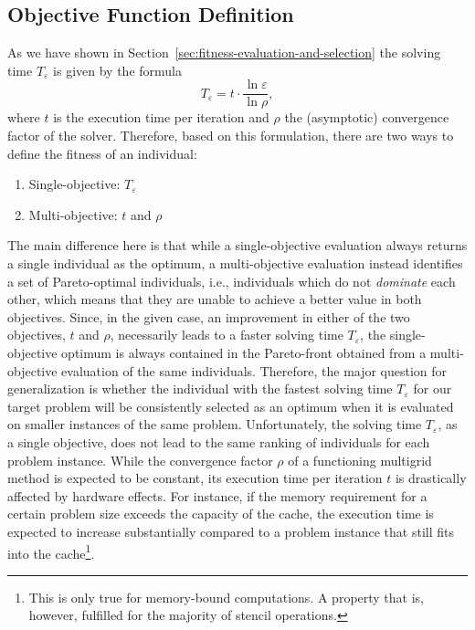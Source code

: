 \subsection{Objective Function Definition}
\label{sec:generalization:objective-function-definition}
As we have shown in Section~\ref{sec:fitness-evaluation-and-selection} the solving time $T_{\varepsilon}$ is given by the formula
\begin{equation*}
	T_{\varepsilon} = t \cdot \frac{\ln \varepsilon}{\ln \rho},
\end{equation*}
where $t$ is the execution time per iteration and $\rho$ the (asymptotic) convergence factor of the solver.
Therefore, based on this formulation, there are two ways to define the fitness of an individual:
\begin{enumerate}
	\item Single-objective: $T_{\varepsilon}$
	\item Multi-objective:  $t$ and $\rho$
\end{enumerate}
The main difference here is that while a single-objective evaluation always returns a single individual as the optimum, a multi-objective evaluation instead identifies a set of Pareto-optimal individuals, i.e., individuals which do not \emph{dominate} each other, which means that they are unable to achieve a better value in both objectives.
Since, in the given case, an improvement in either of the two objectives, $t$ and $\rho$, necessarily leads to a faster solving time $T_{\varepsilon}$, the single-objective optimum is always contained in the Pareto-front obtained from a multi-objective evaluation of the same individuals.
Therefore, the major question for generalization is whether the individual with the fastest solving time $T_{\varepsilon}$ for our target problem will be consistently selected as an optimum when it is evaluated on smaller instances of the same problem.
Unfortunately, the solving time $T_{\varepsilon}$, as a single objective, does not lead to the same ranking of individuals for each problem instance.
While the convergence factor $\rho$ of a functioning multigrid method is expected to be constant, its execution time per iteration $t$ is drastically affected by hardware effects.
For instance, if the memory requirement for a certain problem size exceeds the capacity of the cache, the execution time is expected to increase substantially compared to a problem instance that still fits into the cache\footnote{This is only true for memory-bound computations. A property that is, however, fulfilled for the majority of stencil operations.}.
